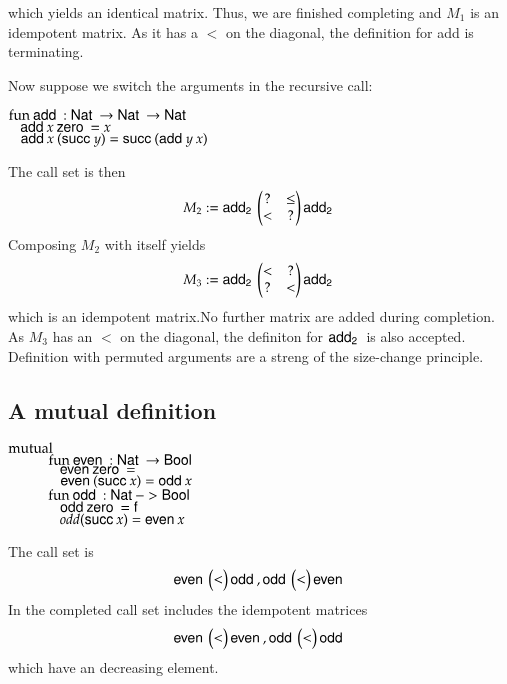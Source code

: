 which yields an identical matrix.
Thus, we are finished completing and $M_1$ is an idempotent matrix.
As it has a $<$ on the diagonal, the definition for add is terminating.

Now suppose we switch the arguments in the recursive call:
\begin{bsp}
$\mathrm{fun}\: \mathsf{add}\: : \mathsf{Nat}\: \rightarrow \mathsf{Nat}\: \rightarrow \mathsf{Nat}\:$\\
$\hspace*{3mm} \mathsf{add}\: x \: \mathsf{zero}\: = x $\\
$\hspace*{3mm} \mathsf{add}\: x \: (\mathsf{succ}\: y) = \mathsf{succ}\: (\mathsf{add}\: y \: x)  $
\end{bsp}

The call set is then 
\[
M_2 := \mathsf{add_2}\:\begin{pmatrix}

? & \leq \\
< & ?   \\
\end{pmatrix}\mathsf{add_2}\:
\]
Composing $M_2$ with itself yields
\[
M_3 := \mathsf{add_2}\: \begin{pmatrix}
< & ?    \\
? & <    \\
\end{pmatrix} \mathsf{add_2}\:
\] 
which is an idempotent matrix.No further matrix are added during completion.
As $M_3$ has an $<$ on the diagonal, the definiton for $\mathsf{add_2}\:$ is also accepted.
Definition with permuted arguments are a streng of the size-change principle.  

\subsection{A mutual definition}

\begin{bsp}
$\mathrm{mutual}\:$\\
$\spcx \fun \even : \Nat \ra \Bool$\\
$\spcx \spc \even \zero = \tt $\\
$\spcx \spc \even (\suc x) = \odd x $\\
$\spcx \fun \odd : \Nat -> \Bool$\\
$\spcx \spc \odd \zero = \ff$\\
$\spcx \spc  odd (\suc x) = \even x$
\end{bsp}
The call set is 
\[
\mathsf{even}\: \begin{pmatrix}
< \\
\end{pmatrix}\mathsf{odd}\:
, 
\mathsf{odd}\: \begin{pmatrix}
< \\
\end{pmatrix}\mathsf{even}\:
\] 
In the completed call set includes the idempotent matrices
\[
\mathsf{even}\: \begin{pmatrix}
< \\
\end{pmatrix}\mathsf{even}\:
, 
\mathsf{odd}\: \begin{pmatrix}
< \\
\end{pmatrix}\mathsf{odd}\:
\] 
which have an decreasing element.
